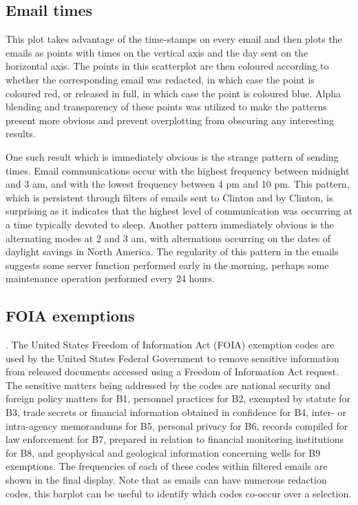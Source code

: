 \documentclass[journal]{vgtc}                %
\begin{document}
\subsection{Email times}
This plot takes advantage of the time-stamps on every email and then plots the emails as points with times on the vertical axis and the day sent on the horizontal axis. The points in this scatterplot are then coloured according to whether the corresponding email was redacted, in which case the point is coloured red, or released in full, in which case the point is coloured blue. Alpha blending and transparency of these points was utilized to make the patterns present more obvious and prevent overplotting from obscuring any interesting results. 

One such result which is immediately obvious is the strange pattern of sending times. Email communications occur with the highest frequency between midnight and 3 am, and with the lowest frequency between 4 pm and 10 pm. This pattern, which is persistent through filters of emails sent to Clinton and by Clinton, is surprising as it indicates that the highest level of communication was occurring at a time typically devoted to sleep. Another pattern immediately obvious is the alternating modes at 2 and 3 am, with alternations occurring on the dates of daylight savings in North America. The regularity of this pattern in the emails suggests some server function performed early in the morning, perhaps some maintenance operation performed every 24 hours.

\subsection{FOIA exemptions}.
 The United States Freedom of Information Act (FOIA) exemption codes \cite{FOIA} are used by the United States Federal Government to remove sensitive information from released documents accessed using a Freedom of Information Act request. The sensitive matters being addressed by the codes are national security and foreign policy matters for B1, personnel practices for B2, exempted by statute for B3, trade secrets or financial information obtained in confidence for B4, inter- or intra-agency memorandums for B5, personal privacy for B6, records compiled for law enforcement for B7, prepared in relation to financial monitoring institutions for B8, and geophysical and geological information concerning wells for B9 exemptions. The frequencies of each of these codes within filtered emails are shown in the final display. Note that as emails can have numerous redaction codes, this barplot can be useful to identify which codes co-occur over a selection.
\end{document}
